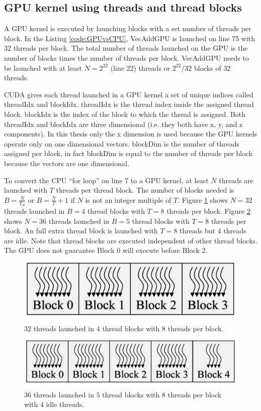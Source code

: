 \subsection{GPU kernel using threads and thread blocks}
A GPU kernel is executed by launching blocks with a set number of threads per block.
In the Listing \ref{code:GPUvsCPU}, VecAddGPU is launched on line 75 with $32$ threads per block.
The total number of threads launched on the GPU is the number of blocks times the number of threads per block.
VecAddGPU needs to be launched with at least $N = 2^{22}$ (line 22) threads or $2^{22}/32$ blocks of $32$ threads.

CUDA gives each thread launched in a GPU kernel a set of unique indices called threadIdx and blockIdx.
threadIdx is the thread index inside the assigned thread block.
blockIdx is the index of the block to which the thread is assigned.
Both threadIdx and blockIdx are three dimensional (i.e. they both have x, y, and z components).
In this thesis only the x dimension is used because the GPU kernels operate only on one dimensional vectors.
blockDim is the number of threads assigned per block, in fact blockDim is equal to the number of threads per block because the vectors are one dimensional.

To convert the CPU ``for loop'' on line 7 to a GPU kernel, at least $N$ threads are launched with $T$ threads per thread block.
The number of blocks needed is $B = \frac{N}{T_B}$ or $B = \frac{N}{T}+1$ if $N$ is not an integer multiple of $T$.
Figure \ref{fig:threadsBlocks32} shows $N = 32$ threads launched in $B = 4$ thread blocks with $T = 8$ threads per block.
Figure \ref{fig:threadsBlocks36} shows $N = 36$ threads launched in $B = 5$ thread blocks with $T = 8$ threads per block. 
An full extra thread block is launched with $T = 8$ threads but $4$ threads are idle.
Note that thread blocks are executed independent of other thread blocks.
The GPU does not guarantee Block $0$ will execute before Block $2$.
\begin{figure}
	\centering\includegraphics[width=4in/100*55]{figures/gpu_intro/threadsBlocks32.pdf}
	\caption{$32$ threads launched in $4$ thread blocks with $8$ threads per block.}
	\label{fig:threadsBlocks32}
\end{figure}
\begin{figure}
	\centering\includegraphics[width=5in/100*55]{figures/gpu_intro/threadsBlocks36.pdf}
	\caption{$36$ threads launched in $5$ thread blocks with $8$ threads per block with $4$ idle threads.}
	\label{fig:threadsBlocks36}
\end{figure}


